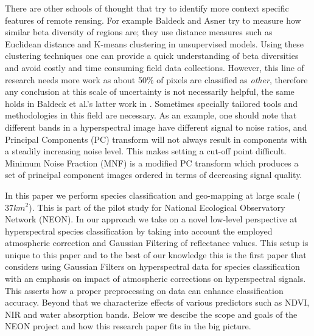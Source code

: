 \documentclass[remotesensing,article,accept,moreauthors,pdftex,12pt,a4paper]{mdpi}
\begin{document}
There are other schools of thought that try to identify more context specific features of remote rensing. 
For example Baldeck and Asner \cite{baldeck2013estimating} try to measure how similar beta diversity of regions are; 
they use distance measures such as Euclidean distance and K-means clustering in unsupervised models. 
Using these clustering techniques one can provide a quick understanding of beta diversities and avoid costly and time consuming field data collections. 
However, this line of research needs more work as about 50\% of pixels are classified as \textit{other}, therefore any conclusion at this scale of uncertainty is not necessarily helpful, the same holds in Baldeck et al.'s latter work in \cite{baldeck2014landscape}.
 Sometimes specially tailored tools and methodologies in this field are necessary. 
 As an example, one should note that different bands in a hyperspectral image have different signal to noise ratios, and Principal Components (PC) transform will not always result in components with a steadily increasing noise level. 
 This makes setting a cut-off point difficult. 
 Minimum Noise Fraction (MNF)   \cite{green1988transformation} is a modified PC transform which produces a set of principal component images ordered in terms of decreasing signal quality. 

In this paper we perform species classification and geo-mapping at large scale ($37 km^2$). 
This is part of the pilot study for National Ecological Observatory Network (NEON). 
In our approach we take on a novel low-level perspective at hyperspectral species classification by taking into account the employed atmospheric correction and Gaussian Filtering of reflectance values. 
This setup is unique to this paper and to the best of our knowledge this is the first paper that considers using Gaussian Filters on hyperspectral data for species classification with an emphasis on impact of atmospheric corrections on hyperspectral signals. 
This asserts how a proper preprocessing on data can enhance classification accuracy.
 Beyond that we characterize effects of various predictors such as NDVI, NIR and water absorption bands.
  Below we descibe the scope and goals of the NEON project and how this research paper fits in the big picture.


\end{document}
